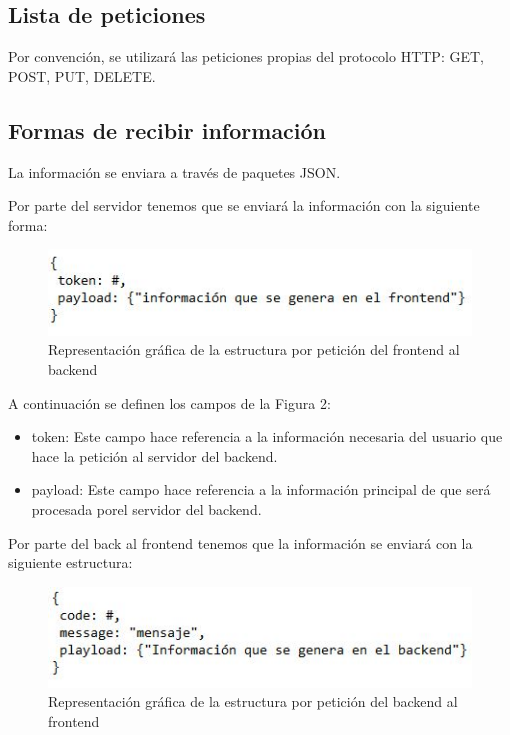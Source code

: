 \subsection{Lista de peticiones}

Por convención, se utilizará las peticiones propias del protocolo HTTP: GET, POST, PUT, DELETE.

\subsection{Formas de recibir información}

La información se enviara a través de paquetes JSON.

Por parte del servidor tenemos que se enviará la información con la siguiente forma:

\begin{figure}[!h]
    \centering
    \includegraphics[width=0.7\linewidth]{images/Arquitectura/Captura.JPG}
    \caption{Representación gráfica de la estructura por petición del frontend al backend}
\end{figure}


A continuación se definen los campos de la Figura 2:
\begin{itemize}
    \item token: Este campo hace referencia a la información necesaria del usuario que hace la petición \newline al servidor del backend.
    \item payload: Este campo hace referencia a la información principal de que será procesada por\newline el servidor del backend.
\end{itemize}


Por parte del back al frontend tenemos que la información se enviará con la siguiente estructura:

\begin{figure}[!h]
    \centering
    \includegraphics[width=0.7\linewidth]{images/Arquitectura/back.JPG}
    \caption{Representación gráfica de la estructura por petición del backend al frontend}
\end{figure}

